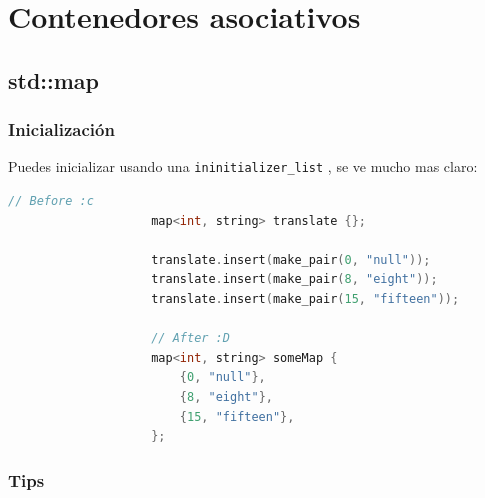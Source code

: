\documentclass[12pt, fleqn]{report}                             %
\theoremstyle{break}                                            %
\newcommand{\textCode}[1]  { \texttt{#1} }                      %
\begin{document}
    \chapter{Contenedores asociativos}
        
        \clearpage
        \section{std::map}

            \subsection{Inicialización}

                Puedes inicializar usando una \textCode{ininitializer\_list}, se ve mucho mas claro:
                \begin{lstlisting}[language=C++, gobble=20]
                    // Before :c
                    map<int, string> translate {};

                    translate.insert(make_pair(0, "null"));
                    translate.insert(make_pair(8, "eight"));
                    translate.insert(make_pair(15, "fifteen"));
                    
                    // After :D
                    map<int, string> someMap {
                        {0, "null"},
                        {8, "eight"},
                        {15, "fifteen"},
                    };

                \end{lstlisting}

            \subsection{Tips}
\end{document}
